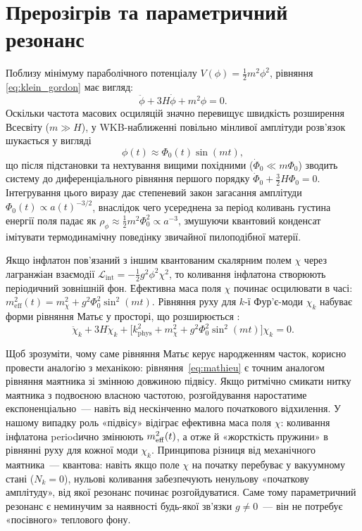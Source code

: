 \section{Прерозігрів та параметричний резонанс}

Поблизу мінімуму параболічного потенціалу $V(\phi) = \frac{1}{2}m^2\phi^2$, рівняння \eqref{eq:klein_gordon} має вигляд:
\begin{equation*}
     \ddot{\phi} + 3H\dot{\phi} + m^2\phi = 0.
\end{equation*}
Оскільки частота масових осциляцій значно перевищує швидкість розширення Всесвіту ($m \gg H$), у WKB-наближенні повільно мінливої амплітуди розв'язок шукається у вигляді
\begin{equation*}
    \phi(t) \approx \Phi_0(t)\sin(mt),
\end{equation*}
що після підстановки та нехтування вищими похідними ($\dot{\Phi}_0 \ll m\Phi_0$) зводить систему до диференціального рівняння першого порядку $\dot{\Phi}_0 + \frac{3}{2}H\Phi_0 = 0$. Інтегрування цього виразу дає степеневий закон загасання амплітуди $\Phi_0(t) \propto a(t)^{-3/2}$, внаслідок чего усереднена за період коливань густина енергії поля падає як $\rho_\phi \approx \frac{1}{2}m^2\Phi_0^2 \propto a^{-3}$, змушуючи квантовий конденсат імітувати термодинамічну поведінку звичайної пилоподібної матерії.

Якщо інфлатон пов'язаний з іншим квантованим скалярним полем $\chi$ через лагранжіан взаємодії $\mathcal{L}_{\mathrm{int}} = -\frac{1}{2}g^2\phi^2\chi^2$, то коливання інфлатона створюють періодичний зовнішній фон. Ефективна маса поля $\chi$ починає осцилювати в часі: $m_{\mathrm{eff}}^2(t) = m_\chi^2 + g^2\Phi_0^2\sin^2(mt)$. Рівняння руху для $k$-ї Фур'є-моди $\chi_k$ набуває форми рівняння Матьє у просторі, що розширюється \cite{kofman_1994, kofman_1997}:
\begin{equation}\label{eq:mathieu}
  \ddot{\chi}_k + 3H\dot{\chi}_k + \bigl[k_\mathrm{phys}^2 + m_\chi^2 + g^2\Phi_0^2\sin^2(mt)\bigr]\chi_k = 0.
\end{equation}

Щоб зрозуміти, чому саме рівняння Матьє керує народженням часток, корисно провести аналогію з механікою: рівняння~\eqref{eq:mathieu} є точним аналогом рівняння маятника зі змінною довжиною підвісу. Якщо ритмічно смикати нитку маятника з подвоєною власною частотою, розгойдування наростатиме експоненціально~--- навіть від нескінченно малого початкового відхилення. У нашому випадку роль «підвісу» відіграє ефективна маса поля $\chi$: коливання інфлатона periodично змінюють $m_{\rm eff}^2(t)$, а отже й «жорсткість пружини» в рівнянні руху для кожної моди $\chi_k$. Принципова різниця від механічного маятника~--- квантова: навіть якщо поле $\chi$ на початку перебуває у вакуумному стані ($N_k = 0$), нульові коливання забезпечують ненульову «початкову амплітуду», від якої резонанс починає розгойдуватися. Саме тому параметричний резонанс є неминучим за наявності будь-якої зв'язки $g \neq 0$~--- він не потребує «посівного» теплового фону.

